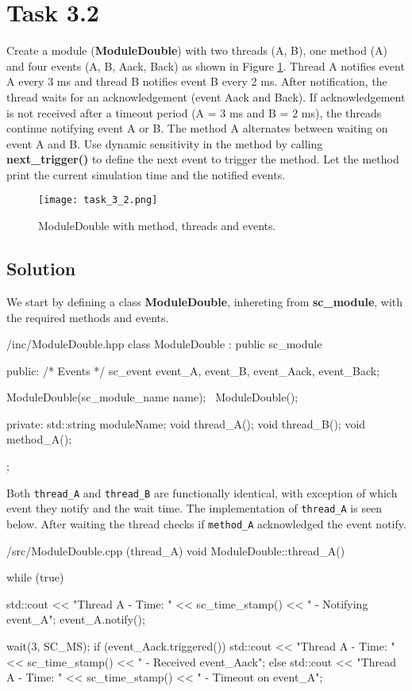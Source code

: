 \documentclass[../main.tex]{subfiles}
\begin{document}
\section{Task 3.2}

Create a module (\textbf{ModuleDouble}) with two threads (A, B), one method (A) and four events (A, B, Aack, Back) as shown in Figure \ref{fig:moduledouble}. Thread A notifies event A every 3 ms and thread B notifies event B every 2 ms. After notification, the thread waits for an acknowledgement (event Aack and Back). If acknowledgement is not received after a timeout period (A = 3 ms and B = 2 ms), the threads continue notifying event A or B. The method A alternates between waiting on event A and B. Use dynamic sensitivity in the method by calling \textbf{next\_trigger()} to define the next event to trigger the method. Let the method print the current simulation time and the notified events.

\begin{figure}[h]
    \centering
    \texttt{[image: task\_3\_2.png]}
    \caption{ModuleDouble with method, threads and events.}
    \label{fig:moduledouble}
\end{figure}

\subsection*{Solution}

We start by defining a class \textbf{ModuleDouble}, inhereting from \textbf{sc\_module}, with the required methods and events.

\begin{myminted}{/inc/ModuleDouble.hpp}
class ModuleDouble : public sc_module {
public:
    /* Events */
    sc_event event_A, event_B, event_Aack, event_Back;

    ModuleDouble(sc_module_name name);
    ~ModuleDouble();

private:
    std::string moduleName;
    void thread_A();
    void thread_B();
    void method_A();
};
\end{myminted}

\newpage

Both \texttt{thread\_A} and \texttt{thread\_B} are functionally identical, with exception of which event they notify and the wait time. The implementation of \texttt{thread\_A} is seen below. After waiting the thread checks if \texttt{method\_A} acknowledged the event notify.

\begin{myminted}{/src/ModuleDouble.cpp (thread\_A)}
void ModuleDouble::thread_A() {
    while (true) {
        std::cout << "Thread A - Time: " << sc_time_stamp() << " - Notifying event_A\n";
        event_A.notify();

        wait(3, SC_MS);
        if (event_Aack.triggered()) {
            std::cout << "Thread A - Time: " << sc_time_stamp() << " - Received event_Aack\n";
        }
        else {
            std::cout << "Thread A - Time: " << sc_time_stamp() << " - Timeout on event_A\n";
        }
    }
}
\end{myminted}
\end{document}
